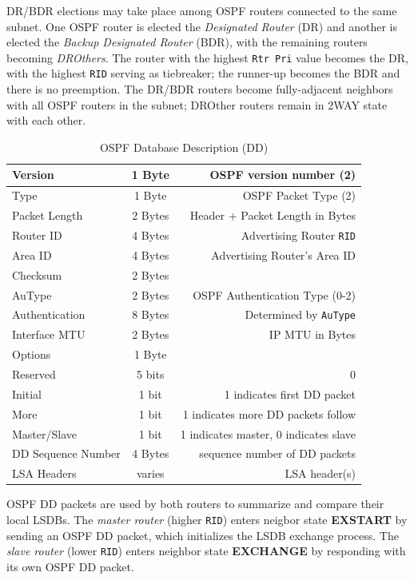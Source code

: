 \documentclass[12pt]{article}
\begin{document}
	 DR/BDR elections may take place among OSPF routers connected to the same subnet. One OSPF router is elected the \textit{Designated Router} (DR) and another is elected the \textit{Backup Designated Router} (BDR), with the remaining routers becoming \textit{DROthers}. The router with the highest \texttt{Rtr Pri} value becomes the DR, with the highest \texttt{RID} serving as tiebreaker; the runner-up becomes the BDR and there is no preemption. The DR/BDR routers become fully-adjacent neighbors with all OSPF routers in the subnet; DROther routers remain in 2WAY state with each other.

	\begin{table}[H]
	\centering
	\caption{OSPF Database Description (DD) \label{tab:OSPF DD}}
	\begin{tabular}{| l | c | r |}
	\hline
	Version			& 1 Byte	& OSPF version number (2)\\\hline
	Type				& 1 Byte	& OSPF Packet Type (2)\\\hline
	Packet Length		& 2 Bytes	& Header + Packet Length in Bytes\\\hline
	Router ID			& 4 Bytes	& Advertising Router \texttt{RID}\\\hline
	Area ID			& 4 Bytes	& Advertising Router's Area ID\\\hline
	Checksum			& 2 Bytes	&\\\hline
	AuType			& 2 Bytes	& OSPF Authentication Type (0-2)\\\hline
	Authentication		& 8 Bytes	& Determined by \texttt{AuType}\\\hline
	Interface MTU		& 2 Bytes	& IP MTU in Bytes\\\hline
	Options			& 1 Byte	&\\\hline
	Reserved			& 5 bits	& 0\\\hline
	Initial				& 1 bit 	& 1 indicates first DD packet\\\hline 
	More				& 1 bit 	& 1 indicates more DD packets follow\\\hline
	Master/Slave		& 1 bit 	& 1 indicates master, 0 indicates slave\\\hline
	DD Sequence Number	& 4 Bytes	& sequence number of DD packets\\\hline
	LSA Headers		& varies	& LSA header(s)\\\hline
	\end{tabular}\end{table}
	OSPF DD packets are used by both routers to summarize and compare their local LSDBs. The \textit{master router} (higher \texttt{RID}) enters neigbor state \textbf{EXSTART} by sending an OSPF DD packet, which initializes the LSDB exchange process. The \textit{slave router} (lower \texttt{RID}) enters neighbor state \textbf{EXCHANGE} by responding with its own OSPF DD packet.
\end{document}
